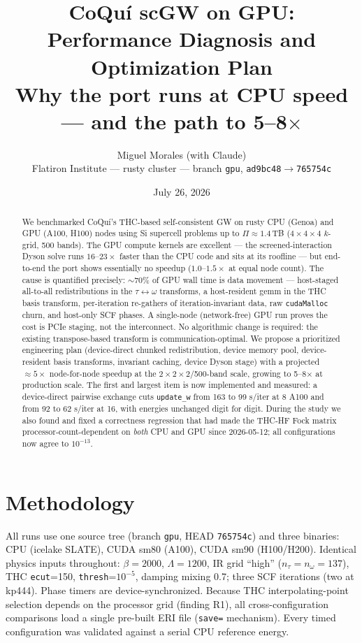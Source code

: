 \documentclass[11pt]{article}
\title{\textbf{CoQu\'i scGW on GPU: Performance Diagnosis and Optimization Plan}\\
\large Why the port runs at CPU speed --- and the path to 5--8$\times$}
\author{Miguel Morales (with Claude)\\ \small Flatiron Institute --- rusty cluster --- branch \texttt{gpu}, \texttt{ad9bc48}$\rightarrow$\texttt{765754c}}
\date{July 26, 2026}
\begin{document}
\maketitle

\begin{abstract}
\noindent
We benchmarked CoQu\'i's THC-based self-consistent GW on rusty CPU (Genoa) and GPU
(A100, H100) nodes using Si supercell problems up to $\Pi \approx 1.4$\,TB
($4{\times}4{\times}4$ $k$-grid, 500 bands). The GPU compute kernels are excellent ---
the screened-interaction Dyson solve runs $16$--$23\times$ faster than the CPU code and
sits at its roofline --- but end-to-end the port shows essentially no speedup
($1.0$--$1.5\times$ at equal node count). The cause is quantified precisely:
$\sim$70\% of GPU wall time is data movement --- host-staged all-to-all redistributions
in the $\tau\!\leftrightarrow\!\omega$ transforms, a host-resident gemm in the THC basis
transform, per-iteration re-gathers of iteration-invariant data, raw \texttt{cudaMalloc}
churn, and host-only SCF phases. A single-node (network-free) GPU run proves the cost is
PCIe staging, not the interconnect. No algorithmic change is required: the existing
transpose-based transform is communication-optimal. We propose a prioritized engineering
plan (device-direct chunked redistribution, device memory pool, device-resident
basis transforms, invariant caching, device Dyson stage) with a projected
$\approx 5\times$ node-for-node speedup at the $2{\times}2{\times}2$/500-band scale,
growing to 5--8$\times$ at production scale. The first and largest item is now
implemented and measured: a device-direct pairwise exchange cuts \texttt{update\_w} from
163 to 99 s/iter at 8 A100 and from 92 to 62 s/iter at 16, with energies unchanged digit
for digit. During the study we also found and fixed a
correctness regression that had made the THC-HF Fock matrix processor-count-dependent on
\emph{both} CPU and GPU since 2026-05-12; all configurations now agree to $10^{-13}$.
\end{abstract}

\section{Methodology}
All runs use one source tree (branch \texttt{gpu}, HEAD \texttt{765754c}) and three
binaries: CPU (icelake SLATE), CUDA sm80 (A100), CUDA sm90 (H100/H200). Identical
physics inputs throughout: $\beta=2000$, $\Lambda=1200$, IR grid ``high''
($n_\tau = n_\omega = 137$), THC \texttt{ecut}=150, \texttt{thresh}=$10^{-5}$,
damping mixing 0.7; three SCF iterations (two at kp444). Phase timers are
device-synchronized. Because THC interpolating-point selection depends on the processor
grid (finding R1), all cross-configuration comparisons load a single pre-built ERI file
(\texttt{save=} mechanism). Every timed configuration was validated against a serial CPU
reference energy.
\end{document}
